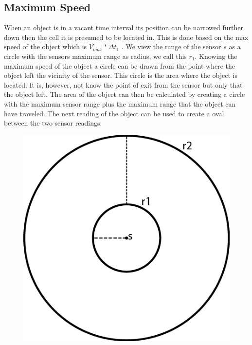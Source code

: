 \subsection{Maximum Speed}
\label{sec:speed}
When an object is in a vacant time interval its position can be narrowed further down then the cell it is presumed to be located in. 
This is done based on the max speed of the object which is $V_{max}*\Delta t_1$ . 
We view the range of the sensor $s$ as a circle with the sensors maximum range as radius, we call this $r_1$. 
Knowing the maximum speed of the object a circle can be drawn from the point where the object left the vicinity of the sensor.
This circle is the area where the object is located. 
It is, however, not know the point of exit from the sensor but only that the object left. 
The area of the object can then be calculated by creating a circle with the maximum sensor range plus the maximum range that the object can have traveled. 
The next reading of the object can be used to create a oval between the two sensor readings.  





\begin{figure}%
\includegraphics{images/speed.png}%
\caption{}%
\label{}%
\end{figure}
